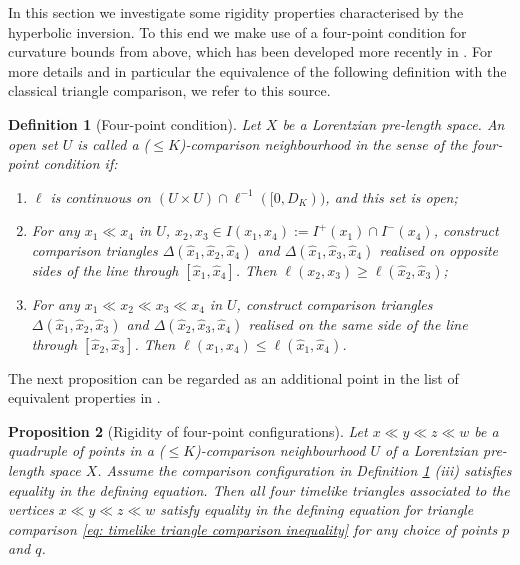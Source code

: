 \documentclass[hidelinks,12pt,a4paper]{article}
\numberwithin{equation}{section}
\theoremstyle{plain}
\newtheorem{definition}{Definition}[section]
\newtheorem{proposition}[definition]{Proposition}
\theoremstyle{definition}
\newcommand{\LpLSn}{Lo\-rentz\-ian pre-length space}
\newcommand{\hx}{\hat{x}}
\begin{document}
In this section we investigate some rigidity properties characterised by the hyperbolic inversion. 
To this end we make use of a four-point condition for curvature bounds from above, which has been developed more recently in \cite{BR25+}. 
For more details and in particular the equivalence of the following definition with the classical triangle comparison, we refer to this source.

\begin{definition}[Four-point condition]
\label{def: CBA four point}
Let $X$ be a \LpLSn. 
An open set $U$ is called a ($\leq K$)-comparison neighbourhood in the sense of the four-point condition if:
\begin{enumerate}[label=(\roman*)]
\item $\ell$ is continuous on $(U\times U)\cap \ell^{-1}([0,D_K))$, and this set is open;
\item For any $x_1\ll x_4$ in $U$, $x_2,x_3\in I(x_1,x_4):=I^+(x_1)\cap I^-(x_4)$, construct comparison triangles $\Delta(\hx_1, \hx_2, \hx_4)$ and $\Delta(\hx_1, \hx_3, \hx_4)$ realised on opposite sides of the line through $[\hx_1,\hx_4]$. 
Then $\ell(x_2,x_3) \geq \ell(\hx_2,\hx_3)$; 
\item For any $x_1 \ll x_2 \ll x_3 \ll x_4$ in $U$, construct comparison triangles $\Delta(\hx_1, \hx_2, \hx_3)$ and $\Delta(\hx_2, \hx_3, \hx_4)$ realised on the same side of the line through $[\hx_2,\hx_3]$. 
Then $\ell(x_1,x_4) \leq \ell(\hx_1,\hx_4)$. 
\end{enumerate}
\end{definition} 

The next proposition can be regarded as an additional point in the list of equivalent properties in \cite[Proposition 4.1]{BBCGRR26+}. 

\begin{proposition}[Rigidity of four-point configurations]
\label{prop: flat triangles}
Let $x \ll y \ll z \ll w$ be a quadruple of points in a ($\leq K$)-comparison neighbourhood $U$ of a Lorentzian pre-length space $X$. 
Assume the comparison configuration in \emph{Definition \ref{def: CBA four point} (iii)} satisfies equality in the defining equation. 
Then all four timelike triangles associated to the vertices $x \ll y \ll z \ll w$ satisfy equality in the defining equation for triangle comparison \eqref{eq: timelike triangle comparison inequality} for any choice of points $p$ and $q$.
\end{proposition}
\end{document}
